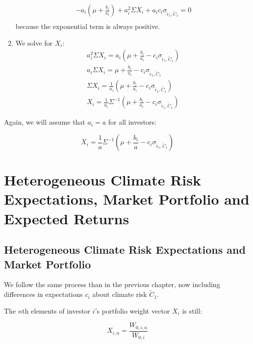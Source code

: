 \begin{enumerate}
\begin{equation}
\begin{aligned}
            -a_i(\mu + \frac{b_i}{a_i}) + a_i^2 \Sigma X_i + a_i c_i \sigma_{\tilde{\epsilon}_1, \tilde{C}_1} = 0 \\
        \end{aligned}
    \end{equation}
    because the exponential term is always positive.
    \item We solve for $X_i$:
    \begin{equation}
        \begin{aligned}
            a_i^2 \Sigma X_i = a_i(\mu + \frac{b_i}{a_i} - c_i \sigma_{\tilde{\epsilon}_1, \tilde{C}_1}) \\
            a_i \Sigma X_i = \mu + \frac{b_i}{a_i} - c_i \sigma_{\tilde{\epsilon}_1, \tilde{C}_1} \\
            \Sigma X_i = \frac{1}{a_i}( \mu + \frac{b_i}{a_i} - c_i \sigma_{\tilde{\epsilon}_1, \tilde{C}_1}) \\
            X_i = \frac{1}{a_i}\Sigma^{-1} ( \mu + \frac{b_i}{a_i} - c_i \sigma_{\tilde{\epsilon}_1, \tilde{C}_1})
        \end{aligned}
    \end{equation}
\end{enumerate}


Again, we will assume that $a_i = a$ for all investors:

\begin{equation}
    X_i = \frac{1}{a}\Sigma^{-1} ( \mu + \frac{b_i}{a} - c_i \sigma_{\tilde{\epsilon}_1, \tilde{C}_1})
\end{equation}

\section{Heterogeneous Climate Risk Expectations, Market 
Portfolio and Expected Returns}


\subsection{Heterogeneous Climate Risk Expectations
and Market Portfolio}

We follow the same process than in the previous 
chapter, now including differences in expectations
$c_i$ 
about climate risk $\tilde{C}_1$.

The $n$th elements of investor $i$'s portfolio weight 
vector $X_i$ is still:

\begin{equation}
    X_{i,n} =  \frac{W_{0,i,n}}{W_{0,i}}
\end{equation}

